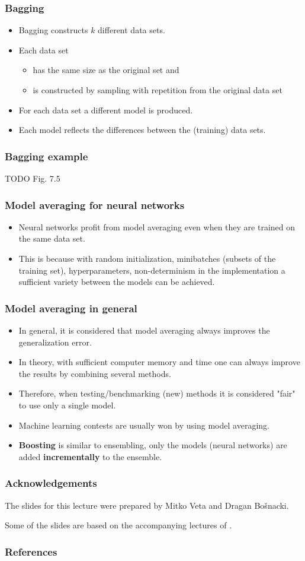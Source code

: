 \documentclass[notes]{beamer}          %
\begin{document}
\begin{frame}
\frametitle{Bagging}
    \begin{itemize}
        \item Bagging constructs $k$ different data sets.
        \item Each data set
        \begin{itemize}
            \item has the same size as the original set and
            \item is constructed by sampling with repetition from the original data set
        \end{itemize}
        \item For each data set a different model is produced.
        \item Each model reflects the differences between the (training) data sets.
    \end{itemize}

\end{frame}

\begin{frame}
\frametitle{Bagging example}
    TODO Fig. 7.5
\end{frame}

\begin{frame}
\frametitle{Model averaging for neural networks}
    \begin{itemize}
        \item Neural networks profit from model averaging even when they are trained on the same data set.
        \item This is because with random initialization, minibatches (subsets of the training set), hyperparameters, non-determinism in the implementation a sufficient variety between the models can be achieved.
    \end{itemize}
\end{frame}


\begin{frame}
\frametitle{Model averaging in general}
    \begin{itemize}
        \item In general, it is considered that model averaging always improves the generalization error.
        \item In theory, with sufficient computer memory and time one can always improve the results by combining several methods.
        \item Therefore, when testing/benchmarking (new) methods it is considered "fair" to use only a single model.
        \item Machine learning contests are usually won by using model averaging.
        \item {\bf Boosting} is similar to ensembling, only the models (neural networks) are added {\bf incrementally} to the ensemble.
    \end{itemize}
\end{frame}


\begin{frame}
\frametitle{Acknowledgements}

The slides for this lecture were prepared by Mitko Veta and Dragan Bo{\v s}nacki.

Some of the slides are based on the accompanying lectures of \cite{deeplearning}.

\end{frame}


\begin{frame}
\frametitle{References}
\printbibliography
\end{frame}
\end{document}
